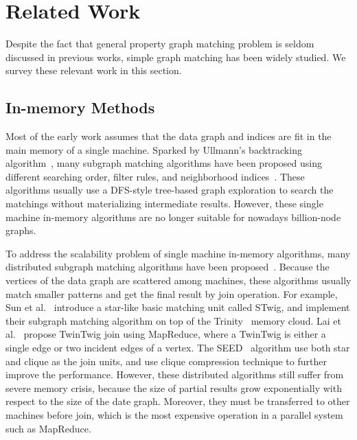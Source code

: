 \section{Related Work}
Despite the fact that general property graph matching problem is seldom discussed in previous works,
simple graph matching has been widely studied.
We survey these relevant work in this section.
\subsection*{In-memory Methods}
Most of the early work assumes that the data graph and indices are fit in the main memory of a single machine.
Sparked by Ullmann's backtracking algorithm~\cite{DBLP:journals/jacm/Ullmann76},
many subgraph matching algorithms have been proposed using different searching order, filter rules, and neighborhood indices~\cite{DBLP:journals/pami/CordellaFSV04,DBLP:journals/pvldb/ShangZLY08,DBLP:conf/sigmod/HeS08,DBLP:conf/sigmod/HanLL13,DBLP:journals/pvldb/LeeHKL12}.
These algorithms usually use a DFS-style tree-based graph exploration to search the matchings without materializing intermediate results.
However, these single machine in-memory algorithms are no longer suitable for nowadays billion-node graphs.

To address the scalability problem of single machine in-memory algorithms,
many distributed subgraph matching algorithms have been proposed~\cite{DBLP:journals/pvldb/SunWWSL12,DBLP:conf/sigmod/ShaoCCMYX14,DBLP:journals/pvldb/LaiQLC15,DBLP:journals/pvldb/LaiQLZC16,DBLP:conf/cloud/SerafiniMS17}.
Because the vertices of the data graph are scattered among machines,
these algorithms usually match smaller patterns and get the final result by join operation.
For example, Sun et al.~\cite{DBLP:journals/pvldb/SunWWSL12} introduce a star-like basic matching unit called STwig,
and implement their subgraph matching algorithm on top of the Trinity~\cite{shao2012the} memory cloud.
Lai et al.~\cite{DBLP:journals/pvldb/LaiQLC15} propose TwinTwig join using MapReduce,
where a TwinTwig is either a single edge or two incident edges of a vertex.
The SEED~\cite{DBLP:journals/pvldb/LaiQLZC16} algorithm use both star and clique as the join units,
and use clique compression technique to further improve the performance.
However, these distributed algorithms still suffer from severe memory crisis,
because the size of partial results grow exponentially with respect to the size of the date graph.
Moreover, they must be transferred to other machines before join,
which is the most expensive operation in a parallel system such as MapReduce.

